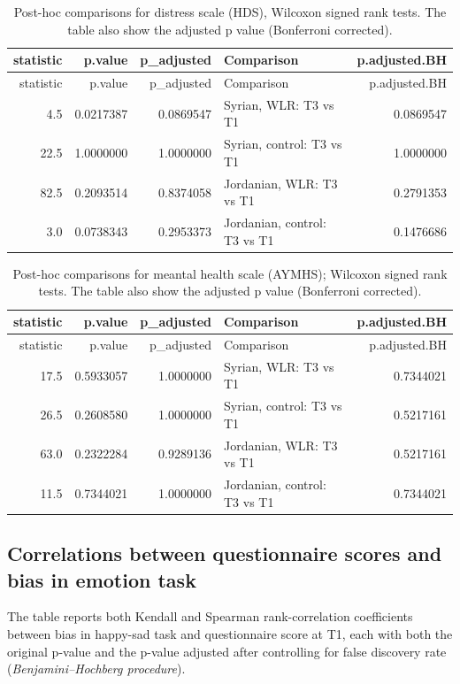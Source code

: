 \documentclass[]{article}
\begin{document}
\begin{longtable}[]{@{}rrrlr@{}}
\caption{Post-hoc comparisons for distress scale (HDS), Wilcoxon signed
rank tests. The table also show the adjusted p value (Bonferroni
corrected).}\tabularnewline
\toprule
statistic & p.value & p\_adjusted & Comparison &
p.adjusted.BH\tabularnewline
\midrule
\endfirsthead
\toprule
statistic & p.value & p\_adjusted & Comparison &
p.adjusted.BH\tabularnewline
\midrule
\endhead
4.5 & 0.0217387 & 0.0869547 & Syrian, WLR: T3 vs T1 &
0.0869547\tabularnewline
22.5 & 1.0000000 & 1.0000000 & Syrian, control: T3 vs T1 &
1.0000000\tabularnewline
82.5 & 0.2093514 & 0.8374058 & Jordanian, WLR: T3 vs T1 &
0.2791353\tabularnewline
3.0 & 0.0738343 & 0.2953373 & Jordanian, control: T3 vs T1 &
0.1476686\tabularnewline
\bottomrule
\end{longtable}

\begin{longtable}[]{@{}rrrlr@{}}
\caption{Post-hoc comparisons for meantal health scale (AYMHS); Wilcoxon
signed rank tests. The table also show the adjusted p value (Bonferroni
corrected).}\tabularnewline
\toprule
statistic & p.value & p\_adjusted & Comparison &
p.adjusted.BH\tabularnewline
\midrule
\endfirsthead
\toprule
statistic & p.value & p\_adjusted & Comparison &
p.adjusted.BH\tabularnewline
\midrule
\endhead
17.5 & 0.5933057 & 1.0000000 & Syrian, WLR: T3 vs T1 &
0.7344021\tabularnewline
26.5 & 0.2608580 & 1.0000000 & Syrian, control: T3 vs T1 &
0.5217161\tabularnewline
63.0 & 0.2322284 & 0.9289136 & Jordanian, WLR: T3 vs T1 &
0.5217161\tabularnewline
11.5 & 0.7344021 & 1.0000000 & Jordanian, control: T3 vs T1 &
0.7344021\tabularnewline
\bottomrule
\end{longtable}

\newpage

\hypertarget{correlations-between-questionnaire-scores-and-bias-in-emotion-task}{%
\subsection{Correlations between questionnaire scores and bias in
emotion
task}\label{correlations-between-questionnaire-scores-and-bias-in-emotion-task}}

The table reports both Kendall and Spearman rank-correlation
coefficients between bias in happy-sad task and questionnaire score at
T1, each with both the original p-value and the p-value adjusted after
controlling for false discovery rate (\emph{Benjamini--Hochberg
procedure}).
\end{document}
